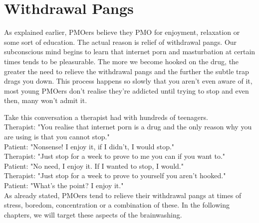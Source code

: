 \documentclass[easypeasy.tex]{subfiles}
\begin{document}
\section{Withdrawal Pangs}

As explained earlier, PMOers believe they PMO for enjoyment, relaxation or some sort of education. The actual reason is relief of withdrawal pangs. Our subconscious mind begins to learn that internet porn and masturbation at certain times tends to be pleasurable. The more we become hooked on the drug, the greater the need to relieve the withdrawal pangs and the further the subtle trap drags you down. This process happens so slowly that you aren't even aware of it, most young PMOers don't realise they're addicted until trying to stop and even then, many won't admit it.

Take this conversation a therapist had with hundreds of teenagers.\\
  Therapist: "You realise that internet porn is a drug and the only reason why you are using is that you cannot stop."\\
  Patient: "Nonsense! I enjoy it, if I didn't, I would stop."\\
  Therapist: "Just stop for a week to prove to me you can if you want to."\\
  Patient: "No need, I enjoy it. If I wanted to stop, I would."\\
  Therapist: "Just stop for a week to prove to yourself you aren't hooked."\\
  Patient: "What's the point? I enjoy it."\\

As already stated, PMOers tend to relieve their withdrawal pangs at times of stress, boredom, concentration or a combination of these. In the following chapters, we will target these aspects of the brainwashing.
\end{document}
